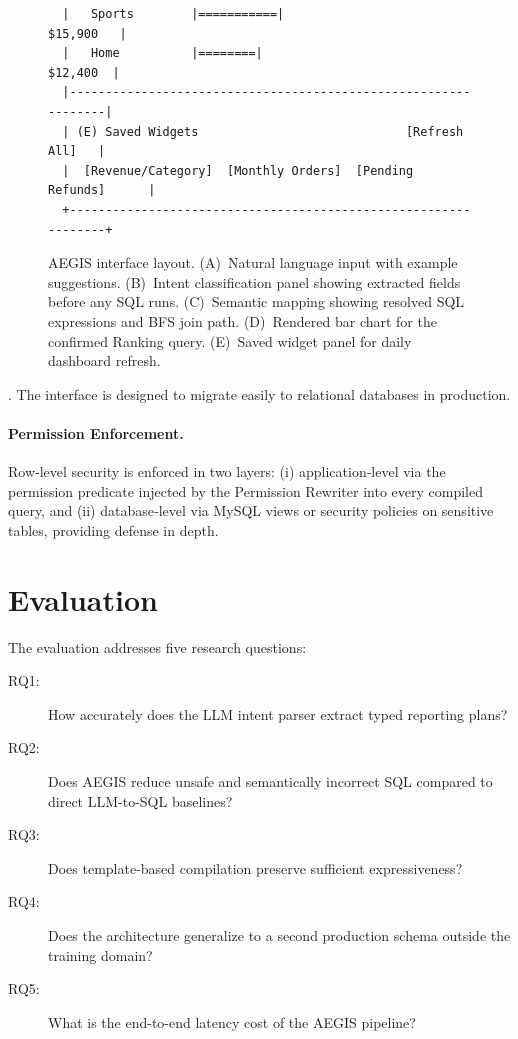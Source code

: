 \documentclass[11pt]{article}
\begin{document}
\begin{figure}[h]
\begin{verbatim}
  |   Sports        |===========|                      $15,900   |
  |   Home          |========|                          $12,400  |
  |----------------------------------------------------------------|
  | (E) Saved Widgets                             [Refresh All]   |
  |  [Revenue/Category]  [Monthly Orders]  [Pending Refunds]      |
  +----------------------------------------------------------------+
\end{verbatim}
\caption{AEGIS interface layout. (A)~Natural language input with example suggestions. (B)~Intent classification panel showing extracted fields before any SQL runs. (C)~Semantic mapping showing resolved SQL expressions and BFS join path. (D)~Rendered bar chart for the confirmed Ranking query. (E)~Saved widget panel for daily dashboard refresh.}\label{fig:ui}
\end{figure}. The interface is designed to migrate easily to relational databases in production.

\paragraph{Permission Enforcement.} Row‑level security is enforced in two layers: (i) application‑level via the permission predicate injected by the Permission Rewriter into every compiled query, and (ii) database‑level via MySQL views or security policies on sensitive tables, providing defense in depth.

\section{Evaluation}
The evaluation addresses five research questions:
\begin{description}
  \item[RQ1:] How accurately does the LLM intent parser extract typed reporting plans?
  \item[RQ2:] Does AEGIS reduce unsafe and semantically incorrect SQL compared to direct LLM-to-SQL baselines?
  \item[RQ3:] Does template-based compilation preserve sufficient expressiveness?
  \item[RQ4:] Does the architecture generalize to a second production schema outside the training domain?
  \item[RQ5:] What is the end-to-end latency cost of the AEGIS pipeline?
\end{description}
\end{document}
